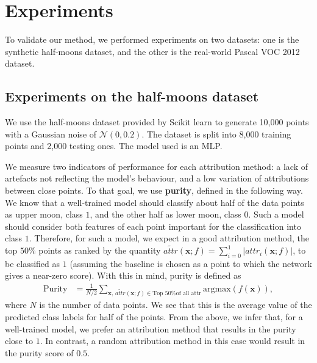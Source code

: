 \section{Experiments}
\label{sec:experiments}

To validate our method, we performed experiments on two datasets: one is the synthetic half-moons dataset, and the other is the real-world Pascal VOC 2012 dataset.

\subsection{Experiments on the half-moons dataset}
\label{subsec:half-moons}

We use the half-moons dataset provided by Scikit learn \citep{scikit-learn} to generate 10,000 points with a Gaussian noise of $\mathcal{N}(0, 0.2)$. The dataset is split into 8,000 training points and 2,000 testing ones. The model used is an MLP.

We measure two indicators of performance for each attribution method: a lack of artefacts not reflecting the model's behaviour, and a low variation of attributions between close points. To that goal, we use \textbf{purity}, defined in the following way. We know that a well-trained model should classify about half of the data points as upper moon, class $1$, and the other half as lower moon, class $0$. Such a model should consider both features of each point important for the classification into class $1$. Therefore, for such a model, we expect in a good attribution method, the top $50\%$ points as ranked by the quantity $\widetilde{attr}(\textbf{x}; f) = \sum_{i=0}^1 |attr_i(\textbf{x}; f)|$, to be classified as $1$ (assuming the baseline is chosen as a point to which the network gives a near-zero score). With this in mind, purity is defined as
\begin{equation}
\begin{split}
    \textrm{Purity} &= \frac{1}{N/2}\sum_{\textbf{x}, \, \widetilde{attr}(\textbf{x}; f) \in \textrm{Top 50\% of all attr}} \textrm{argmax}(f(\textbf{x})),
\end{split}
\label{eq:moons-purity}
\end{equation}
where $N$ is the number of data points. We see that this is the average value of the predicted class labels for half of the points. From the above, we infer that, for a well-trained model, we prefer an attribution method that results in the purity close to $1$. In contrast, a random attribution method in this case would result in the purity score of $0.5$. 

